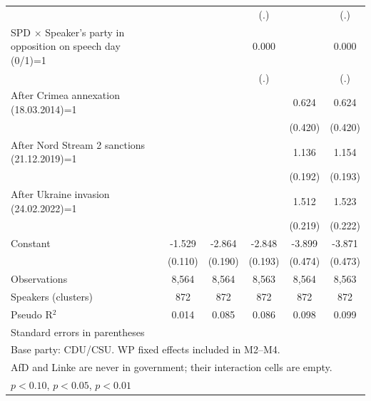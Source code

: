 \begin{table}[htbp]
\begin{tabular}{l*{5}{c}}
                    &                     &                     &         (.)         &                     &         (.)         \\
\addlinespace
SPD $\times$ Speaker's party in opposition on speech day (0/1)=1&                     &                     &       0.000         &                     &       0.000         \\
                    &                     &                     &         (.)         &                     &         (.)         \\
\addlinespace
After Crimea annexation (18.03.2014)=1&                     &                     &                     &       0.624         &       0.624         \\
                    &                     &                     &                     &     (0.420)         &     (0.420)         \\
\addlinespace
After Nord Stream 2 sanctions (21.12.2019)=1&                     &                     &                     &       1.136\sym{***}&       1.154\sym{***}\\
                    &                     &                     &                     &     (0.192)         &     (0.193)         \\
\addlinespace
After Ukraine invasion (24.02.2022)=1&                     &                     &                     &       1.512\sym{***}&       1.523\sym{***}\\
                    &                     &                     &                     &     (0.219)         &     (0.222)         \\
\addlinespace
Constant            &      -1.529\sym{***}&      -2.864\sym{***}&      -2.848\sym{***}&      -3.899\sym{***}&      -3.871\sym{***}\\
                    &     (0.110)         &     (0.190)         &     (0.193)         &     (0.474)         &     (0.473)         \\
\midrule
Observations        &       8,564         &       8,564         &       8,563         &       8,564         &       8,563         \\
Speakers (clusters) &         872         &         872         &         872         &         872         &         872         \\
Pseudo R$^2$        &       0.014         &       0.085         &       0.086         &       0.098         &       0.099         \\
\bottomrule
\multicolumn{6}{l}{\footnotesize Standard errors in parentheses}\\
\multicolumn{6}{l}{\footnotesize Base party: CDU/CSU. WP fixed effects included in M2--M4.}\\
\multicolumn{6}{l}{\footnotesize AfD and Linke are never in government; their interaction cells are empty.}\\
\multicolumn{6}{l}{\footnotesize \sym{*} \(p<0.10\), \sym{**} \(p<0.05\), \sym{***} \(p<0.01\)}\\
\end{tabular}
\end{table}
